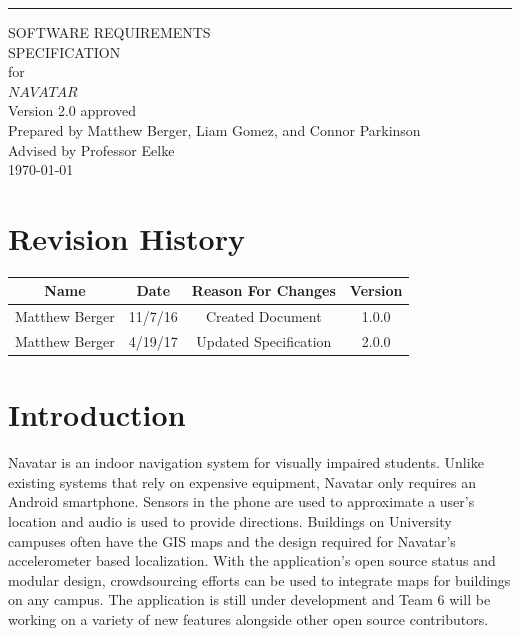 \documentclass{scrreprt}
\date{}
\def\myversion{2.0 }
\begin{document}
\begin{flushright}
    \rule{16cm}{5pt}\vskip1cm
    \begin{bfseries}
        \Huge{SOFTWARE REQUIREMENTS\\ SPECIFICATION}\\
        \vspace{1.6cm}
        for\\
        \vspace{1.6cm}
        $NAVATAR$\\
        \vspace{1.6cm}
        \LARGE{Version \myversion approved}\\
        \vspace{1.6cm}
        Prepared by Matthew Berger, Liam Gomez, and Connor Parkinson\\ 
        \vspace{1.6cm}
        Advised by Professor Eelke\\
        \vspace{1.6cm}
        \today\\
    \end{bfseries}
\end{flushright}

{\small\tableofcontents}

\chapter*{Revision History}

\begin{center}
    \begin{tabular}{|c|c|c|c|}
        \hline
	    Name & Date & Reason For Changes & Version\\
        \hline
	    Matthew Berger & 11/7/16 & Created Document & 1.0.0\\
        \hline
        Matthew Berger & 4/19/17 & Updated Specification & 2.0.0\\
        \hline
    \end{tabular}
\end{center}

\chapter{Introduction}

Navatar is an indoor navigation system for visually impaired students. Unlike existing
systems that rely on expensive equipment, Navatar only requires an Android smartphone.
Sensors in the phone are used to approximate a user's location and audio is used to provide
directions. Buildings on University campuses often have the GIS maps and the design required
for Navatar’s accelerometer based localization. With the application’s open source status and
modular design, crowdsourcing efforts can be used to integrate maps for buildings on any
campus. The application is still under development and Team 6 will be working on a variety of
new features alongside other open source contributors.\\
\end{document}
